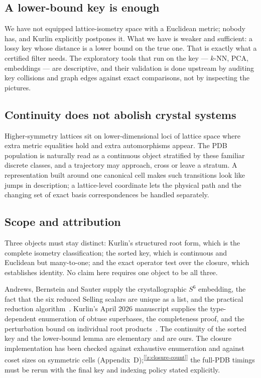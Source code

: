 \documentclass[11pt]{article}
\newcommand{\chk}[1]{\textsuperscript{[\ref{#1}]}}
\begin{document}
\subsection{A lower-bound key is enough}

We have not equipped lattice-isometry space with a Euclidean metric; nobody has, and Kurlin explicitly postpones it. What we have is weaker and sufficient: a lossy key whose distance is a lower bound on the true one. That is exactly what a certified filter needs. The exploratory tools that run on the key --- $k$-NN, PCA, embeddings --- are descriptive, and their validation is done upstream by auditing key collisions and graph edges against exact comparisons, not by inspecting the pictures.

\subsection{Continuity does not abolish crystal systems}

Higher-symmetry lattices sit on lower-dimensional loci of lattice space where extra metric equalities hold and extra automorphisms appear. The PDB population is naturally read as a continuous object stratified by these familiar discrete classes, and a trajectory may approach, cross or leave a stratum. A representation built around one canonical cell makes such transitions look like jumps in description; a lattice-level coordinate lets the physical path and the changing set of exact basis correspondences be handled separately.

\subsection{Scope and attribution}

Three objects must stay distinct: Kurlin's structured root form, which is the complete isometry classification; the sorted key, which is continuous and Euclidean but many-to-one; and the exact operator test over the closure, which establishes identity. No claim here requires one object to be all three.

Andrews, Bernstein and Sauter supply the crystallographic $S^6$ embedding, the fact that the six reduced Selling scalars are unique as a list, and the practical reduction algorithm~\cite{ab1988,abs2019,ab2023}. Kurlin's April 2026 manuscript supplies the type-dependent enumeration of obtuse superbases, the completeness proof, and the perturbation bound on individual root products~\cite{kurlin2026}. The continuity of the sorted key and the lower-bound lemma are elementary and are ours. The closure implementation has been checked against exhaustive enumeration and against coset sizes on symmetric cells (Appendix~D);\chk{z:closure-count} the full-PDB timings must be rerun with the final key and indexing policy stated explicitly.
\end{document}
